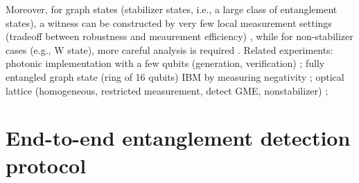 \documentclass[
aps,
pra,
twocolumn,
floatfix,
]{revtex4-2}
\theoremstyle{plain}
\theoremstyle{definition}
\begin{document}
Moreover, for graph states (stabilizer states, i.e., a large class of entanglement states),
a witness can be constructed by very few local measurement settings (tradeoff between robustness and meaurement efficiency) \cite{tothDetectingGenuineMultipartite2005} \cite{tothEntanglementDetectionStabilizer2005} \cite{zhouDetectingMultipartiteEntanglement2019},
while for non-stabilizer cases (e.g., W state), more careful analysis is required \cite{zhangEfficientEntanglementGeneration2021} \cite{zhuMachineLearningDerivedEntanglement2021}.
Related experiments: photonic implementation with a few qubits (generation, verification) \cite{luEntanglementStructureEntanglement2018};
fully entangled graph state (ring of 16 qubits) IBM by measuring negativity \cite{wang16qubitIBMUniversal2018};
optical lattice (homogeneous, restricted measurement, detect GME, nonstabilizer) \cite{zhouSchemeCreateVerify2022};

\section{End-to-end entanglement detection protocol}\label{sec:protocol}
\end{document}
